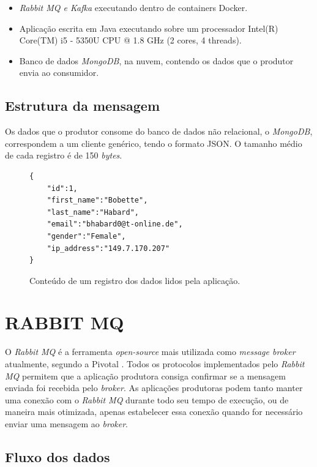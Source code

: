 \documentclass[letterpaper, 10 pt, conference]{ieeeconf}  %
\begin{document}
\begin{itemize}
\item \textit {Rabbit MQ e Kafka} executando dentro de containers Docker.
\item Aplicação escrita em Java executando sobre um processador Intel(R) Core(TM) i5 - 5350U CPU @ 1.8 GHz (2 cores, 4 threads).
\item Banco de dados \textit{MongoDB}, na nuvem, contendo os dados que o produtor envia ao consumidor.
\end{itemize}

\subsection{Estrutura da mensagem}

Os dados que o produtor consome do banco de dados não relacional, o \textit{MongoDB}, correspondem a um cliente genérico, tendo o formato JSON. O tamanho médio de cada registro é de 150 \textit{bytes}.

\begin{figure}[thpb]
      \begin{verbatim}
{
    "id":1,
    "first_name":"Bobette",
    "last_name":"Habard",
    "email":"bhabard0@t-online.de",
    "gender":"Female",
    "ip_address":"149.7.170.207"
}
      \end{verbatim}
      \caption{Conteúdo de um registro dos dados lidos pela aplicação.}
      \label{fig:document}
\end{figure}

\section{RABBIT MQ}

O \textit{Rabbit MQ} é a ferramenta \textit{open-source} mais utilizada como \textit{message broker} atualmente, segundo a Pivotal \cite{c2}. Todos os protocolos implementados pelo \textit{Rabbit MQ} permitem que a aplicação produtora consiga confirmar se a mensagem enviada foi recebida pelo \textit{broker}. As aplicações produtoras podem tanto manter uma conexão com o \textit{Rabbit MQ} durante todo seu tempo de execução, ou de maneira mais otimizada, apenas estabelecer essa conexão quando for necessário enviar uma mensagem ao \textit{broker}.

\subsection{Fluxo dos dados}
\end{document}
